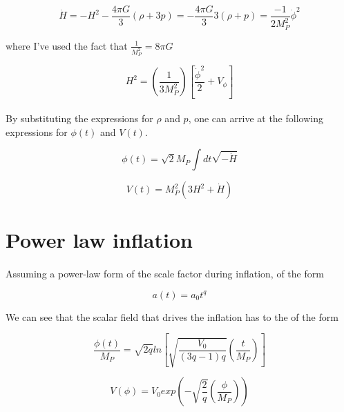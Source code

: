 \documentclass[12pt,a4paper,oneside]{book}
\begin{document}
\begin{equation}
 \dot{H} = -H^2 -\frac{4\pi G}{3}(\rho + 3p) = -\frac{4\pi G}{3}3(\rho + p)
= \frac{-1}{2M_P^2}\dot{\phi}^2
\end{equation}

\noindent where I've used the fact that $\frac{1}{M_P^2} = 8\pi G$

\begin{equation}
H^2 = (\frac{1}{3M_P^2})[\frac{\dot{\phi}^2}{2} + V_{\phi}]
\end{equation}

\paragraph*{} By substituting the expressions for $\rho$ and $p$, one can arrive at the following expressions for $\phi(t)$ and $V(t)$.

\begin{equation}
\phi(t)= \sqrt{2}M_P \int dt \sqrt{-\dot{H}}
\end{equation}

\begin{equation}
V(t) = M_P^2(3H^2 + \dot{H})
\end{equation}

\section{Power law inflation}

\paragraph*{} Assuming a power-law form of the scale factor during inflation, of the form

\begin{equation}
a(t) = a_0t^q
\end{equation}

\noindent We can see that the scalar field that drives the inflation has to the of the form

\begin{equation}
\frac{\phi(t)}{M_P} =\sqrt{2q}ln[\sqrt{\frac{V_0}{(3q-1)q}}(\frac{t}{M_P})]
\end{equation}

\begin{equation}
V(\phi) = V_0exp(-\sqrt{\frac{2}{q}}(\frac{\phi}{M_P}))
\end{equation}

\end{document}
